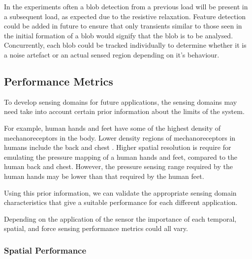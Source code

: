 In the experiments often a blob detection from a previous load will be present in a subsequent load, as expected due to the resistive relaxation. Feature detection could be added in future to ensure that only transients similar to those seen in the initial formation of a blob would signify that the blob is to be analysed. Concurrently, each blob could be tracked individually to determine whether it is a noise artefact or an actual sensed region depending on it's behaviour. 


\subsection{Performance Metrics}\label{Performance Metrics3}
To develop sensing domains for future applications, the sensing domains may need take into account certain prior information about the limits of the system.

For example, human hands and feet have some of the highest density of mechanoreceptors in the body. Lower density regions of mechanoreceptors in humans include the back and chest \citep{Kamkim2008}. Higher spatial resolution is require for emulating the pressure mapping of a human hands and feet, compared to the human back and chest. However, the pressure sensing range required by the human hands may be lower than that required by the human feet.

Using this prior information, we can validate the appropriate sensing domain characteristics that give a suitable performance for each different application.

Depending on the application of the sensor the importance of each temporal, spatial, and force sensing performance metrics could all vary.

\subsubsection{Spatial Performance}\label{Spaital Performance3}

